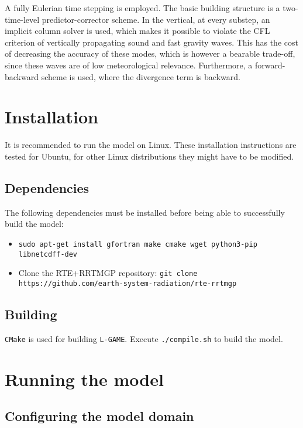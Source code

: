 \documentclass[10pt]{report}
\begin{document}
A fully Eulerian time stepping is employed. The basic building structure is a two-time-level predictor-corrector scheme. In the vertical, at every substep, an implicit column solver is used, which makes it possible to violate the CFL criterion of vertically propagating sound and fast gravity waves. This has the cost of decreasing the accuracy of these modes, which is however a bearable trade-off, since these waves are of low meteorological relevance. Furthermore, a forward-backward scheme is used, where the divergence term is backward.

\chapter{Installation}
\label{chap:installation}

It is recommended to run the model on Linux. These installation instructions are tested for Ubuntu, for other Linux distributions they might have to be modified.

\section{Dependencies}
\label{sec:dependencies}

The following dependencies must be installed before being able to successfully build the model:

\begin{itemize}
\item \texttt{sudo apt-get install gfortran make cmake wget python3-pip libnetcdff-dev}
\item Clone the RTE+RRTMGP repository: \texttt{git clone https://github.com/earth-system-radiation/rte-rrtmgp}
\end{itemize}

\section{Building}
\label{sec:building}

\texttt{CMake} is used for building \texttt{L-GAME}. Execute \texttt{./compile.sh} to build the model.

\chapter{Running the model}
\label{chap:running_the_model}

\section{Configuring the model domain}
\label{sec:configuring_the_model_domain}
\end{document}
